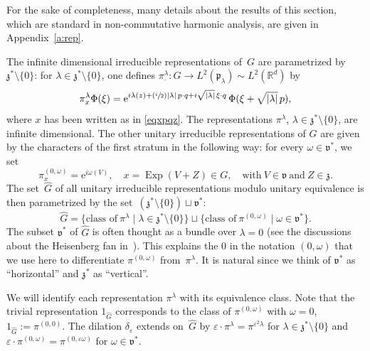 \documentclass[10pt]{amsart}
\newcommand{\Psfrac}[2]{(\sfrac{#1}{#2})}
\let\sep\mid
\newcommand{\rme}{\mathrm{e}}
\DeclareMathOperator{\Exp}{Exp}
\theoremstyle{plain}
\theoremstyle{definition}
\let\eps\varepsilon
\def\R{{\mathbb R}}
\begin{document}
For the sake of completeness, many details about the results of this section, which are standard in non-commutative harmonic analysis, are given in Appendix~\ref{a:rep}.

The infinite dimensional irreducible representations of~$G$ are parametrized by \hbox{$\mathfrak z^*\!\setminus\!\{0\}$}:
for $\lambda\in \mathfrak z^*\setminus\{0\}$, one defines $\pi_{\cdot}^\lambda:G\to L^2(\mathfrak p_\lambda) \sim L^2(\R^d)$ by
\begin{equation}\label{def:pilambda}
\pi^{\lambda}_{x} \Phi(\xi)=
\rme^{i\lambda(z)+ \Psfrac i2 |\lambda|\,p \cdot q +i\sqrt{|\lambda|} \,\xi \cdot q} \,\Phi(\xi+\sqrt{|\lambda|}\,p),
\end{equation}
where $x$ has been written as in \eqref{eqxpqz}.
The representations $\pi^\lambda$, $\lambda\in \mathfrak z^*\setminus\{0\}$, are infinite dimensional.
The other unitary irreducible representations of $G$
are given by the characters of the first stratum in the following way:
for every $\omega\in \mathfrak v ^*$,
we set
\begin{equation}\label{eq:0omega}
\pi^{(0,\omega)}_x= \rme^{i \omega(V)}, \quad
x=\Exp (V+Z)\in G, \quad\mbox{with}\ V\in{\mathfrak v} \ \mbox{and} \ Z\in{\mathfrak z}.
\end{equation}
The set~$\widehat G$ of all unitary irreducible representations modulo unitary equivalence
is then parametrized by the set~$({\mathfrak z}^*\setminus \{0\})\sqcup {\mathfrak v}^*$:
\begin{equation}
\label{eq_widehatG}	
\widehat G =
\{\mbox{class of} \ \pi^\lambda \sep \lambda \in \mathfrak z^* \setminus\{0\}\}
\sqcup \{\mbox{class of} \ \pi^{(0,\omega)} \sep \omega \in \mathfrak v^* \}.
\end{equation}
The subset $\mathfrak v^*$ of $\widehat G$ is often thought as a bundle over $\lambda=0$ (see the discussions about the Heisenberg fan in~\cite[Lem.\,2.2]{FF1}). This explains the $0$ in the notation $(0,\omega)$ that we use here to differentiate $\pi^{(0,\omega)}$ from~$\pi^\lambda$. It is natural since we think of $\mathfrak v^*$ as ``horizontal'' and $\mathfrak z^*$ as ``vertical''.

We will identify each representation $\pi^\lambda$ with its equivalence class.
Note that the trivial representation $1_{\widehat G}$ corresponds to the class of $\pi^{(0,\omega)}$ with
$\omega=0$, \ie $
1_{\widehat G}
:=
\pi^{(0,0)}.
$
The dilation $\delta_\eps$ extends on~$\widehat G$ by $\eps \cdot\pi^ \lambda=\pi^{\eps^2 \lambda} $ for $\lambda\in\mathfrak z^*\setminus \{0\}$ and $\eps \cdot \pi^{(0,\omega) }= \pi^{(0,\eps \omega)} $ for $\omega\in\mathfrak v^*$.
\end{document}
